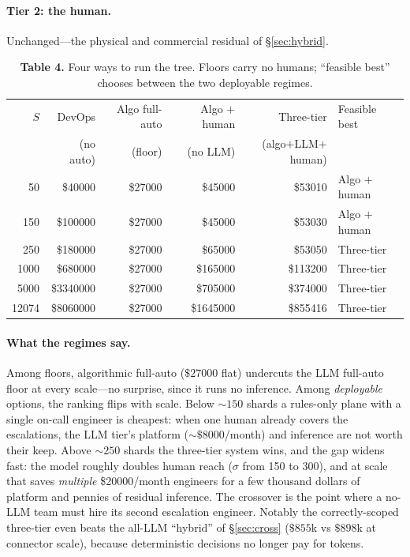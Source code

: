 \documentclass[11pt]{article}
\newcommand{\shards}{S}
\begin{document}
\paragraph{Tier 2: the human.} Unchanged---the physical and commercial residual of
\S\ref{sec:hybrid}.

\begin{table}[h]
\centering
\caption*{\textbf{Table 4.} Four ways to run the tree. Floors carry no humans; ``feasible best''
chooses between the two deployable regimes.}
\setlength{\tabcolsep}{5.5pt}
\renewcommand{\arraystretch}{1.12}
\begin{tabular}{@{}rrrrrl@{}}
\toprule
$\shards$ & DevOps & Algo full-auto & Algo $+$ human & Three-tier & Feasible best \\
 & (no auto) & (floor) & (no LLM) & (algo$+$LLM$+$human) & \\
\midrule
\num{50}    & \$\num{40000}   & \$\num{27000} & \cellcolor{coolrow}\$\num{45000}  & \$\num{53010}  & Algo $+$ human \\
\num{150}   & \$\num{100000}  & \$\num{27000} & \cellcolor{coolrow}\$\num{45000}  & \$\num{53030}  & Algo $+$ human \\
\num{250}   & \$\num{180000}  & \$\num{27000} & \$\num{65000}  & \cellcolor{coolrow}\$\num{53050}  & Three-tier \\
\num{1000}  & \$\num{680000}  & \$\num{27000} & \$\num{165000} & \cellcolor{coolrow}\$\num{113200} & Three-tier \\
\num{5000}  & \$\num{3340000} & \$\num{27000} & \$\num{705000} & \cellcolor{coolrow}\$\num{374000} & Three-tier \\
\num{12074} & \$\num{8060000} & \$\num{27000} & \$\num{1645000}& \cellcolor{coolrow}\$\num{855416} & Three-tier \\
\bottomrule
\end{tabular}
\end{table}

\paragraph{What the regimes say.} Among floors, algorithmic full-auto ($\$\num{27000}$ flat)
undercuts the LLM full-auto floor at every scale---no surprise, since it runs no inference. Among
\emph{deployable} options, the ranking flips with scale. Below $\sim\!\num{150}$ shards a rules-only
plane with a single on-call engineer is cheapest: when one human already covers the escalations, the
LLM tier's platform ($\sim\$\num{8000}$/month) and inference are not worth their keep. Above
$\sim\!\num{250}$ shards the three-tier system wins, and the gap widens fast: the model roughly
doubles human reach ($\sigma$ from \num{150} to \num{300}), and at scale that saves \emph{multiple}
\$\num{20000}/month engineers for a few thousand dollars of platform and pennies of residual
inference. The crossover is the point where a no-LLM team must hire its second escalation
engineer. Notably the correctly-scoped three-tier even beats the all-LLM ``hybrid'' of
\S\ref{sec:cross} ($\$\num{855}$k vs $\$\num{898}$k at connector scale), because deterministic
decisions no longer pay for tokens.
\end{document}
